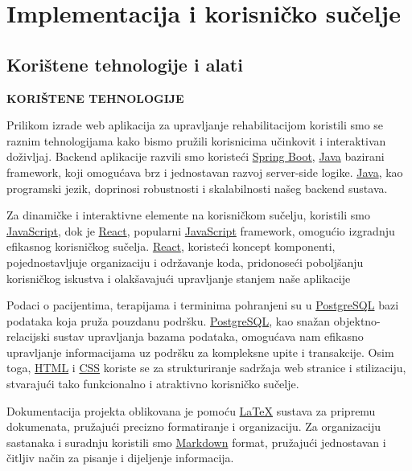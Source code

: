 \chapter{Implementacija i korisničko sučelje}
		
		
		\section{Korištene tehnologije i alati}
	
			
\textbf{	KORIŠTENE TEHNOLOGIJE
} 

Prilikom izrade web aplikacija za upravljanje rehabilitacijom koristili smo se raznim tehnologijama kako bismo pružili korisnicima učinkovit i interaktivan doživljaj. Backend aplikacije razvili smo koristeći \href{https://www.spring.io/projects/spring-boot}{Spring Boot}, \href{https://www.oracle.com/java}{Java} bazirani framework, koji omogućava brz i jednostavan razvoj server-side logike. \href{https://www.oracle.com/java}{Java}, kao programski jezik, doprinosi robustnosti i skalabilnosti našeg backend sustava.

Za dinamičke i interaktivne elemente na korisničkom sučelju, koristili smo \href{https://www.developer.mozilla.org/en-US/docs/Web/JavaScript}{JavaScript}, dok je \href{https://www.reactjs.org}{React}, popularni \href{https://www.developer.mozilla.org/en-US/docs/Web/JavaScript}{JavaScript} framework, omogućio izgradnju efikasnog korisničkog sučelja. \href{https://www.reactjs.org}{React}, koristeći koncept komponenti, pojednostavljuje organizaciju i održavanje koda, pridonoseći poboljšanju korisničkog iskustva i olakšavajući upravljanje stanjem naše aplikacije 

Podaci o pacijentima, terapijama i terminima pohranjeni su u \href{https://www.postgresql.org}{PostgreSQL} bazi podataka koja pruža pouzdanu podršku. \href{https://www.postgresql.org}{PostgreSQL}, kao snažan objektno-relacijski sustav upravljanja bazama podataka, omogućava nam efikasno upravljanje informacijama uz podršku za kompleksne upite i transakcije. Osim toga, \href{https://www.developer.mozilla.org/en-US/docs/Web/HTML}{HTML} i \href{https://www.developer.mozilla.org/en-US/docs/Web/CSS}{CSS} koriste se za strukturiranje sadržaja web stranice i stilizaciju, stvarajući tako funkcionalno i atraktivno korisničko sučelje.

Dokumentacija projekta oblikovana je pomoću \href{https://www.overleaf.com/learn/latex/Learn_LaTeX_in_30_minutes}{LaTeX} sustava za pripremu dokumenata, pružajući precizno formatiranje i organizaciju. Za organizaciju sastanaka i suradnju koristili smo \href{https://www.markdownguide.org}{Markdown} format, pružajući jednostavan i čitljiv način za pisanje i dijeljenje informacija.

